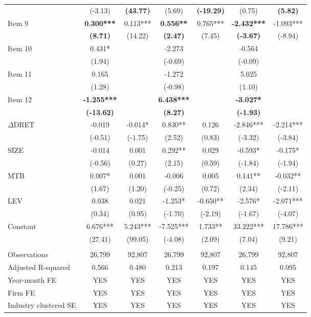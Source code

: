 \begin{table}[H]
\begin{tabular}{lcccccc}
      & (-3.13) & \textbf{(43.77)} & (5.69) &\textbf{ (-19.29)} & (0.75) & \textbf{(5.82)} \\
    Item 9 & \textbf{0.300***} & 0.113*** & \textbf{0.556**} & 0.765*** & \textbf{-2.432***} & -1.093*** \\
      & \textbf{(8.71)} & (14.22) & \textbf{(2.47)} & (7.45) & \textbf{(-3.67)} & (-8.94) \\
    Item 10 & 0.431* &   & -2.273 &   & -0.564 &  \\
      & (1.94) &   & (-0.69) &   & (-0.09) &  \\
    Item 11 & 0.165 &   & -1.272 &   & 5.025 &  \\
      & (1.28) &   & (-0.98) &   & (1.10) &  \\
    Item 12 & \textbf{-1.255***} &   & \textbf{6.438***} &   & \textbf{-3.027*} &  \\
      & \textbf{(-13.62)} &   & \textbf{(8.27)} &   & \textbf{(-1.93)} &  \\
    $\Delta$DRET & -0.019 & -0.014* & 0.830** & 0.126 & -2.846*** & -2.214*** \\
      & (-0.51) & (-1.75) & (2.52) & (0.83) & (-3.32) & (-3.84) \\
    SIZE & -0.014 & 0.001 & 0.292** & 0.029 & -0.593* & -0.175* \\
      & (-0.56) & (0.27) & (2.15) & (0.59) & (-1.84) & (-1.94) \\
    MTB & 0.007* & 0.001 & -0.006 & 0.005 & 0.141** & -0.032** \\
      & (1.67) & (1.20) & (-0.25) & (0.72) & (2.34) & (-2.11) \\
    LEV & 0.038 & 0.021 & -1.253* & -0.650** & -2.576* & -2.071*** \\
      & (0.34) & (0.95) & (-1.70) & (-2.19) & (-1.67) & (-4.07) \\
    Constant & 6.676*** & 5.243*** & -7.525*** & 1.733** & 33.222*** & 17.786*** \\
      & (27.41) & (99.05) & (-4.08) & (2.09) & (7.04) & (9.21) \\
      &   &   &   &   &   &  \\
    Observations & 26,799 & 92,807 & 26,799 & 92,807 & 26,799 & 92,807 \\
    Adjusted R-squared & 0.566 & 0.480 & 0.213 & 0.197 & 0.145 & 0.095 \\
    Year-month FE & YES & YES & YES & YES & YES & YES \\
    Firm FE & YES & YES & YES & YES & YES & YES \\
    Industry clustered SE & YES & YES & YES & YES & YES & YES \\
    \bottomrule
    \bottomrule
    \end{tabular}%
\end{table}%
